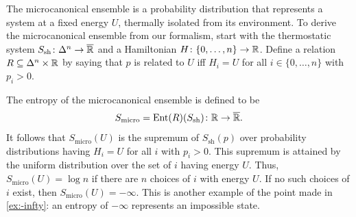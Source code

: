 \documentclass[12pt, reqno]{amsart}
\newcommand{\extreal}{\overline{\real}}
\newcommand{\Ssh}{S_{\mathrm{sh}}} %
\newcommand{\Sbath}{S_{\mathrm{bath}}} %
\begin{document}

\begin{example} \label{ex:microcanonical_ensemble}
    The microcanonical ensemble is a probability distribution that represents a system at a fixed energy $U$, thermally isolated from its environment.
    To derive the microcanonical ensemble from our formalism, start with the thermostatic system $\Ssh \maps \Delta^n \to \extreal$ and a Hamiltonian $H \colon \{0,\dots,n\} \rightarrow \mathbb{R}$. Define a relation $R \subseteq \Delta^n \times \mathbb{R}$ by saying that $p$ is related to $U$ iff $H_i = U$ for all $i \in \{0,\dots, n\}$ with $p_i > 0$.
    
    The entropy of the microcanonical ensemble is defined to be
    \[   S_{\textrm{micro}} = \Ent(R)(\Ssh) \maps \real \to \extreal .\]
    It follows that $S_{\textrm{micro}}(U)$ is the supremum of $\Ssh(p)$ over probability distributions having $H_i = U$ for all $i$ with $p_i > 0$. This supremum is attained by the uniform distribution over the set of $i$ having energy $U$. Thus, $S_{\textrm{micro}}(U) = \log n$ if there are $n$ choices of $i$ with energy $U$. If no such choices of $i$ exist, then  $S_{\textrm{micro}}(U) = -\infty$. This is another example of the point made in \cref{ex:-infty}: an entropy of $-\infty$ represents an impossible state.
\end{example}
\end{document}
